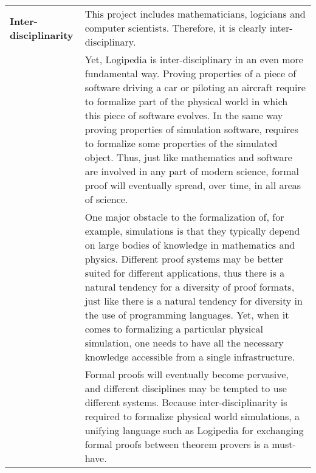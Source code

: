 \begin{longtable}{|p{}|p{}|}
{\bf Inter-disciplinarity}
&
This project includes mathematicians, logicians and computer
scientists. Therefore, it is clearly inter-disciplinary.\\
&
\hspace{0.4cm}
Yet, Logipedia is inter-disciplinary in an even more fundamental
way. Proving properties of a piece of software driving a car or
piloting an aircraft require to formalize part of the physical world
in which this piece of software evolves. In the same way proving
properties of simulation software, requires to formalize some
properties of the simulated object.  Thus, just like mathematics and
software are involved in any part of modern science, formal proof will
eventually spread, over time, in all areas of science.\\
&
\hspace{0.4cm}
One major obstacle to the formalization of, for example, simulations
is that they typically depend on large bodies of knowledge in
mathematics and physics.  Different proof systems may be better
suited for different applications, thus there is a natural tendency
for a diversity of proof formats, just like there is a natural
tendency for diversity in the use of programming languages.  Yet, when
it comes to formalizing a particular physical simulation, one needs to
have all the necessary knowledge accessible from a single infrastructure.\\
&
\hspace{0.4cm}
Formal proofs will eventually become pervasive, and
different disciplines may be tempted to use different systems.
Because inter-disciplinarity is required to formalize physical world
simulations, a unifying language such as Logipedia for exchanging
formal proofs between theorem provers is a must-have.\\
\hline
\end{longtable}



